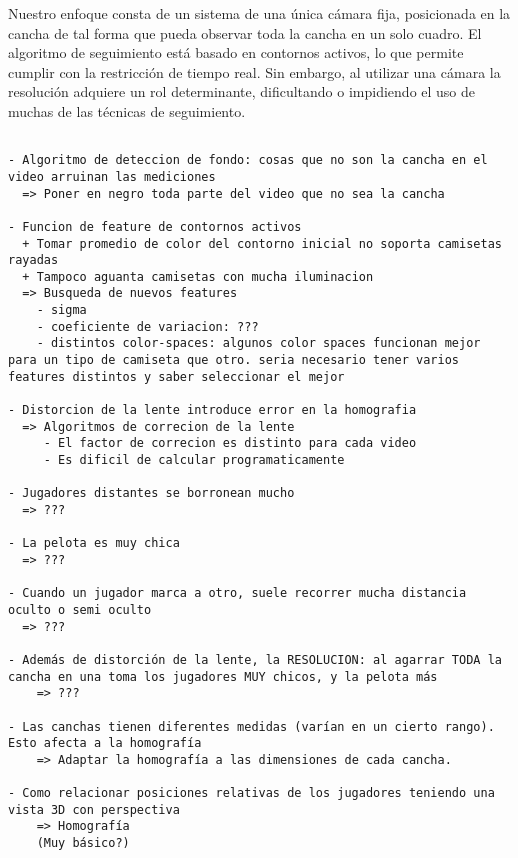 \documentclass[a4paper,10pt]{article}
\begin{document}
Nuestro enfoque consta de un sistema de una única cámara fija, posicionada en la cancha de tal forma que pueda observar 
toda la cancha en un solo cuadro. El algoritmo de seguimiento está basado en contornos activos, lo que permite cumplir 
con la restricción de tiempo real. Sin embargo, al utilizar una cámara la resolución adquiere un rol determinante, 
dificultando o impidiendo el uso de muchas de las técnicas de seguimiento.




\begin{verbatim}

- Algoritmo de deteccion de fondo: cosas que no son la cancha en el video arruinan las mediciones
  => Poner en negro toda parte del video que no sea la cancha

- Funcion de feature de contornos activos
  + Tomar promedio de color del contorno inicial no soporta camisetas rayadas
  + Tampoco aguanta camisetas con mucha iluminacion
  => Busqueda de nuevos features
    - sigma
    - coeficiente de variacion: ???
    - distintos color-spaces: algunos color spaces funcionan mejor para un tipo de camiseta que otro. seria necesario tener varios features distintos y saber seleccionar el mejor

- Distorcion de la lente introduce error en la homografia
  => Algoritmos de correcion de la lente
     - El factor de correcion es distinto para cada video
     - Es dificil de calcular programaticamente

- Jugadores distantes se borronean mucho
  => ???

- La pelota es muy chica
  => ???

- Cuando un jugador marca a otro, suele recorrer mucha distancia oculto o semi oculto
  => ???

- Además de distorción de la lente, la RESOLUCION: al agarrar TODA la cancha en una toma los jugadores MUY chicos, y la pelota más
    => ???

- Las canchas tienen diferentes medidas (varían en un cierto rango). Esto afecta a la homografía
    => Adaptar la homografía a las dimensiones de cada cancha.

- Como relacionar posiciones relativas de los jugadores teniendo una vista 3D con perspectiva
    => Homografía
    (Muy básico?)

\end{verbatim}
\end{document}

